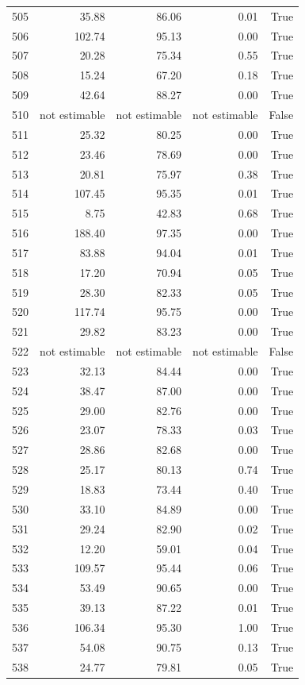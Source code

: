 \begin{longtable}{rrrrr}
505 & 35.88 & 86.06 & 0.01 & True \\
506 & 102.74 & 95.13 & 0.00 & True \\
507 & 20.28 & 75.34 & 0.55 & True \\
508 & 15.24 & 67.20 & 0.18 & True \\
509 & 42.64 & 88.27 & 0.00 & True \\
510 & not estimable & not estimable & not estimable & False \\
511 & 25.32 & 80.25 & 0.00 & True \\
512 & 23.46 & 78.69 & 0.00 & True \\
513 & 20.81 & 75.97 & 0.38 & True \\
514 & 107.45 & 95.35 & 0.01 & True \\
515 & 8.75 & 42.83 & 0.68 & True \\
516 & 188.40 & 97.35 & 0.00 & True \\
517 & 83.88 & 94.04 & 0.01 & True \\
518 & 17.20 & 70.94 & 0.05 & True \\
519 & 28.30 & 82.33 & 0.05 & True \\
520 & 117.74 & 95.75 & 0.00 & True \\
521 & 29.82 & 83.23 & 0.00 & True \\
522 & not estimable & not estimable & not estimable & False \\
523 & 32.13 & 84.44 & 0.00 & True \\
524 & 38.47 & 87.00 & 0.00 & True \\
525 & 29.00 & 82.76 & 0.00 & True \\
526 & 23.07 & 78.33 & 0.03 & True \\
527 & 28.86 & 82.68 & 0.00 & True \\
528 & 25.17 & 80.13 & 0.74 & True \\
529 & 18.83 & 73.44 & 0.40 & True \\
530 & 33.10 & 84.89 & 0.00 & True \\
531 & 29.24 & 82.90 & 0.02 & True \\
532 & 12.20 & 59.01 & 0.04 & True \\
533 & 109.57 & 95.44 & 0.06 & True \\
534 & 53.49 & 90.65 & 0.00 & True \\
535 & 39.13 & 87.22 & 0.01 & True \\
536 & 106.34 & 95.30 & 1.00 & True \\
537 & 54.08 & 90.75 & 0.13 & True \\
538 & 24.77 & 79.81 & 0.05 & True \\

\end{longtable}
